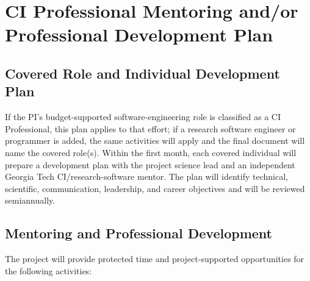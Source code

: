 \section*{CI Professional Mentoring and/or Professional Development Plan}

\subsection*{Covered Role and Individual Development Plan}

If the PI's budget-supported software-engineering role is classified as a CI
Professional, this plan applies to that effort; if a research software
engineer or programmer is added, the same activities will apply and the final
document will name the covered role(s). Within the first month, each covered
individual will prepare a development plan with the project science lead and
an independent Georgia Tech CI/research-software mentor. The plan will identify
technical, scientific, communication, leadership, and career objectives and
will be reviewed semiannually.

\subsection*{Mentoring and Professional Development}

The project will provide protected time and project-supported opportunities
for the following activities:

